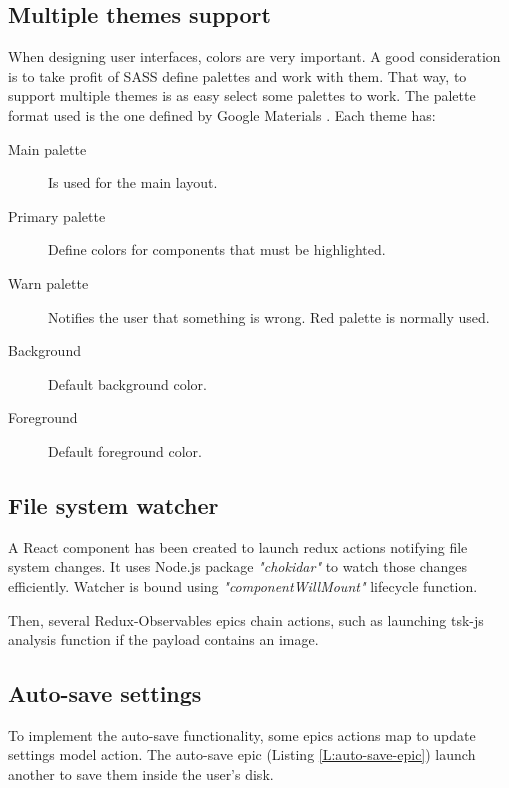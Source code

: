 \subsection{Multiple themes support}

When designing user interfaces, colors are very important. A good consideration
is to take profit of SASS define palettes and work with them. That way, to
support multiple themes is as easy select some palettes to work. The palette
format used is the one defined by Google Materials \cite{google-materials-web}.
Each theme has:

\begin{description}
	\item[Main palette] Is used for the main layout.
	\item[Primary palette] Define colors for components that must be
	highlighted.
	\item[Warn palette] Notifies the user that something is wrong. Red palette
	is normally used.
	\item[Background] Default background color.
	\item[Foreground] Default foreground color.
\end{description}


\subsection{File system watcher}

A React component has been created to launch redux actions notifying file
system changes. It uses Node.js package \textit{"chokidar"} to watch those
changes efficiently. Watcher is bound using \textit{"componentWillMount"}
lifecycle function.

Then, several Redux-Observables epics chain actions, such as launching tsk-js
analysis function if the payload contains an image.

\subsection{Auto-save settings}

To implement the auto-save functionality, some epics actions map to update
settings model action. The auto-save epic (Listing \ref{L:auto-save-epic})
launch another to save them inside the user's disk.

\begin{codefigure}
\end{codefigure}


